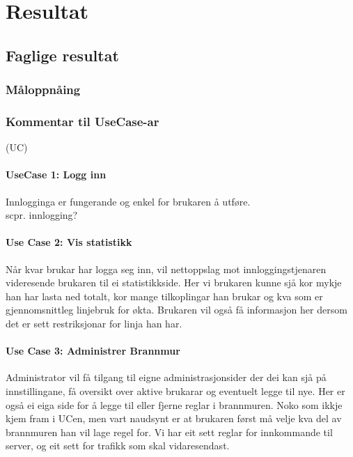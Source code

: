 \documentclass[nynorsk,12pt,a4paper,oneside]{book}
\begin{document}
\paragraph{}


\chapter{Resultat}

\section{Faglige resultat}
\subsection{Måloppnåing}
	
\subsection{Kommentar til UseCase-ar}
(UC)
\subsubsection{UseCase 1: Logg inn}
Innlogginga er fungerande og enkel for brukaren å utføre. \\
scpr. innlogging?

\subsubsection{Use Case 2: Vis statistikk}
Når kvar brukar har logga seg inn, vil nettoppslag mot innloggingstjenaren videresende brukaren til ei statistikkside. Her vi brukaren kunne sjå kor mykje han har lasta ned totalt, kor mange tilkoplingar han brukar og kva som er gjennomsnittleg linjebruk for økta. Brukaren vil også få informasjon her dersom det er sett restriksjonar for linja han har.

\subsubsection{Use Case 3: Administrer Brannmur}
Administrator vil få tilgang til eigne administrasjonsider der dei kan sjå på innstillingane, få oversikt over aktive brukarar og eventuelt legge til nye. Her er også ei eiga side for å legge til eller fjerne reglar i brannmuren. Noko som ikkje kjem fram i UCen, men vart naudsynt er at brukaren først må velje kva del av brannmuren han vil lage regel for. Vi har eit sett reglar for innkommande til server, og eit sett for trafikk som skal vidaresendast.
\end{document}
